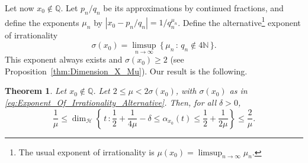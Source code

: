 \documentclass[11pt,reqno]{amsart}
\newtheorem{thm}{Theorem}[section]
\theoremstyle{definition}
\begin{document}
Let now $x_0 \not\in \mathbb Q$.
Let $p_n/q_n$ be its approximations by continued fractions, 
and define the exponents $\mu_n$ by $|x_0 - p_n/q_n| = 1/q_n^{\mu_n}$. 
Define the alternative\footnote{The usual exponent of irrationality is $\mu(x_0) = \limsup_{n \to \infty} \mu_n$.} exponent of irrationality 
\begin{equation}\label{eq:Exponent_Of_Irrationality_Alternative}
\sigma(x_0) = \limsup_{n \to \infty} \,  \{ \, \mu_n \, : \, q_n 
\not\in 4\mathbb N
\,   \}. 
\end{equation}
This exponent always exists and $\sigma(x_0) \geq 2$ (see Proposition~\ref{thm:Dimension_X_Mu}). 
Our result is the following.
\begin{thm}\label{thm:Main_Theorem_Irrationals}
Let $x_0 \not\in \mathbb Q$. 
Let $2 \leq \mu < 2\sigma(x_0)$, 
with $\sigma(x_0)$ as in \eqref{eq:Exponent_Of_Irrationality_Alternative}.
Then, for all $\delta > 0$, 
\begin{equation}\label{eq:Main_Theorem_Irrationals}
\frac{1}{\mu} \leq \operatorname{dim}_{\mathcal H} \left\{   \, t \, : \frac12 + \frac{1}{4\mu} - \delta  \leq \alpha_{x_0}(t) \leq \frac12 + \frac{1}{2\mu}    \right\}  \leq \frac{2}{\mu}. 
\end{equation}
\end{thm}
\end{document}
